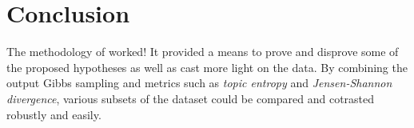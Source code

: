 \section {Conclusion}
\label{conclusion}

The methodology of \cite{hall-jurafsky-manning:2008:EMNLP} worked! It provided a means to prove and disprove some of the proposed hypotheses as well as cast more light on the data. By combining the output Gibbs sampling and metrics such as \textit{topic entropy} and \textit{Jensen-Shannon divergence}, various subsets of the dataset could be compared and cotrasted robustly and easily.
